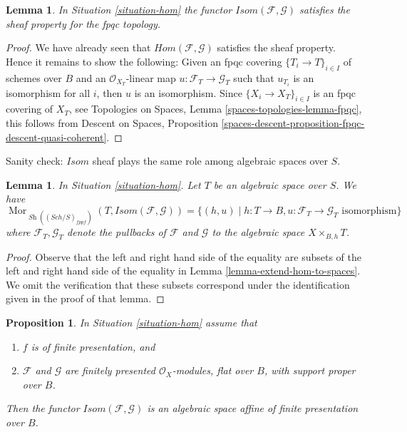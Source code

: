 \documentclass{stacks-project}
\theoremstyle{plain}
\newtheorem{proposition}[subsection]{Proposition}
\newtheorem{lemma}[subsection]{Lemma}
\theoremstyle{definition}
\theoremstyle{remark}
\numberwithin{equation}{subsection}
\def\Sch{\mathit{Sch}}
\def\Mor{\mathop{\mathrm{Mor}}\nolimits}
\def\Sh{\mathop{\mathit{Sh}}\nolimits}
\begin{document}
\begin{lemma}
\label{lemma-isom-sheaf}
In Situation \ref{situation-hom} the functor
$\mathit{Isom}(\mathcal{F}, \mathcal{G})$ 
satisfies the sheaf property for the fpqc topology.
\end{lemma}

\begin{proof}
We have already seen that $\mathit{Hom}(\mathcal{F}, \mathcal{G})$
satisfies the sheaf property. Hence it remains to show the following:
Given an fpqc covering $\{T_i \to T\}_{i \in I}$ of schemes over $B$
and an $\mathcal{O}_{X_T}$-linear map
$u : \mathcal{F}_T \to \mathcal{G}_T$ such that
$u_{T_i}$ is an isomorphism for all $i$, then $u$ is an isomorphism.
Since $\{X_i \to X_T\}_{i \in I}$ is an fpqc covering of $X_T$, see
Topologies on Spaces, Lemma \ref{spaces-topologies-lemma-fpqc},
this follows from
Descent on Spaces, Proposition
\ref{spaces-descent-proposition-fpqc-descent-quasi-coherent}.
\end{proof}

\noindent
Sanity check: $\mathit{Isom}$ sheaf plays the same role among algebraic spaces
over $S$.

\begin{lemma}
\label{lemma-extend-isom-to-spaces}
In Situation \ref{situation-hom}. Let $T$ be an algebraic space over $S$.
We have
$$
\Mor_{\Sh((\Sch/S)_{fppf})}(T, \mathit{Isom}(\mathcal{F}, \mathcal{G})) =
\{(h, u) \mid
h : T \to B, u : \mathcal{F}_T \to \mathcal{G}_T\text{ isomorphism}\}
$$
where $\mathcal{F}_T, \mathcal{G}_T$ denote the pullbacks of $\mathcal{F}$
and $\mathcal{G}$ to the algebraic space $X \times_{B, h} T$.
\end{lemma}

\begin{proof}
Observe that the left and right hand side of the equality are
subsets of the left and right hand side of the equality in
Lemma \ref{lemma-extend-hom-to-spaces}.
We omit the verification that these subsets correspond under
the identification given in the proof of that lemma.
\end{proof}

\begin{proposition}
\label{proposition-isom}
In Situation \ref{situation-hom} assume that
\begin{enumerate}
\item $f$ is of finite presentation, and
\item $\mathcal{F}$ and $\mathcal{G}$ are finitely presented
$\mathcal{O}_X$-modules, flat over $B$, with support proper over $B$.
\end{enumerate}
Then the functor $\mathit{Isom}(\mathcal{F}, \mathcal{G})$ is
an algebraic space affine of finite presentation over $B$.
\end{proposition}
\end{document}
